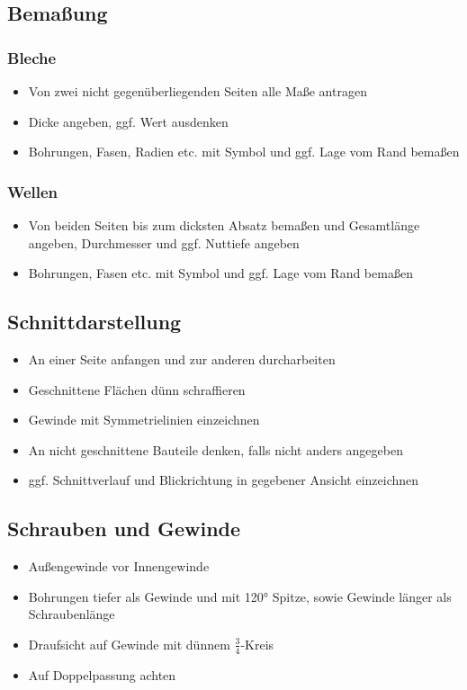 \documentclass[a4paper,parskip=half*,DIV=7,fontsize=11pt]{scrartcl}
\begin{document}
\subsection{Bemaßung}
\subsubsection{Bleche}
\begin{itemize}
	\item Von zwei nicht gegenüberliegenden Seiten alle Maße antragen
	\item Dicke angeben, ggf. Wert ausdenken
	\item Bohrungen, Fasen, Radien etc. mit Symbol und ggf. Lage vom Rand bemaßen
\end{itemize}

\subsubsection{Wellen}
\begin{itemize}
	\item Von beiden Seiten bis zum dicksten Absatz bemaßen und Gesamtlänge angeben, Durchmesser und ggf. Nuttiefe angeben
	\item Bohrungen, Fasen etc. mit Symbol und ggf. Lage vom Rand bemaßen
\end{itemize}

\subsection{Schnittdarstellung}
\begin{itemize}
	\item An einer Seite anfangen und zur anderen durcharbeiten
	\item Geschnittene Flächen dünn schraffieren
	\item Gewinde mit Symmetrielinien einzeichnen
	\item An nicht geschnittene Bauteile denken, falls nicht anders angegeben
	\item ggf. Schnittverlauf und Blickrichtung in gegebener Ansicht einzeichnen
\end{itemize}

\subsection{Schrauben und Gewinde}
\begin{itemize}
	\item Außengewinde vor Innengewinde
	\item Bohrungen tiefer als Gewinde und mit 120° Spitze, sowie Gewinde länger als Schraubenlänge
	\item Draufsicht auf Gewinde mit dünnem $\frac{3}{4}$-Kreis
	\item Auf Doppelpassung achten
\end{itemize}
\end{document}

